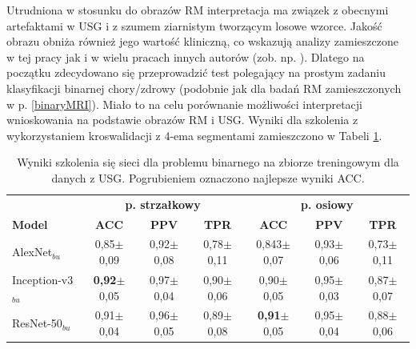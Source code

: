 Utrudniona w stosunku do obrazów RM interpretacja ma związek z obecnymi artefaktami w USG i z szumem ziarnistym tworzącym losowe wzorce. Jakość obrazu obniża również jego wartość kliniczną, co wskazują analizy zamieszczone w tej pracy jak i w wielu pracach innych autorów (zob. np. \cite{Khan2003, Ibrahim2013}). Dlatego na początku zdecydowano się przeprowadzić test polegający na prostym zadaniu klasyfikacji binarnej chory/zdrowy (podobnie jak dla badań RM zamieszczonych w p. \ref{binaryMRI}). Miało \linebreak to na celu porównanie możliwości interpretacji wnioskowania na podstawie obrazów RM i USG. Wyniki dla szkolenia z wykorzystaniem kroswalidacji z 4-ema segmentami zamieszczono w Tabeli \ref{tab:usg-binary}.
\renewcommand{\arraystretch}{1.2}
\begin{table}[]
	\centering
	\scriptsize
	\setlength{\tabcolsep}{3pt}
	\setlength\extrarowheight{2pt}
	\caption{Wyniki szkolenia się sieci dla problemu binarnego na zbiorze treningowym dla danych z USG. Pogrubieniem oznaczono najlepsze wyniki ACC.}
	\label{tab:usg-binary}
	\begin{tabular}{l||c|c|c||c|c|c}
		& \multicolumn{3}{c}{\textbf{p. strzałkowy}} & \multicolumn{3}{c}{\textbf{p. osiowy}} \\
		\textbf{Model} & \textbf{ACC} & \textbf{PPV} & \textbf{TPR} & \textbf{ACC} & \textbf{PPV} & \textbf{TPR} \\ \hline \hline
		AlexNet$_{bu}$ & 0,85$\pm$0,09 & 0,92$\pm$0,08 & 0,78$\pm$0,11 & 0,843$\pm$0,07 & 0,93$\pm$0,06 & 0,73$\pm$0,11  \\ \hline
		Inception-v3$_{bu}$ & \textbf{0,92}$\pm$0,05 & 0,97$\pm$0,04 & 0,90$\pm$0,06 & 0,90$\pm$0,05 & 0,95$\pm$0,03 & 0,87$\pm$0,07 \\ \hline
		ResNet-50$_{bu}$ & 0,91$\pm$0,04 & 0,96$\pm$0,05 & 0,89$\pm$0,08 & \textbf{0,91}$\pm$0,05 & 0,95$\pm$0,04 & 0,88$\pm$0,06 \\ 
	\end{tabular}
\end{table}
\renewcommand{\arraystretch}{1}

